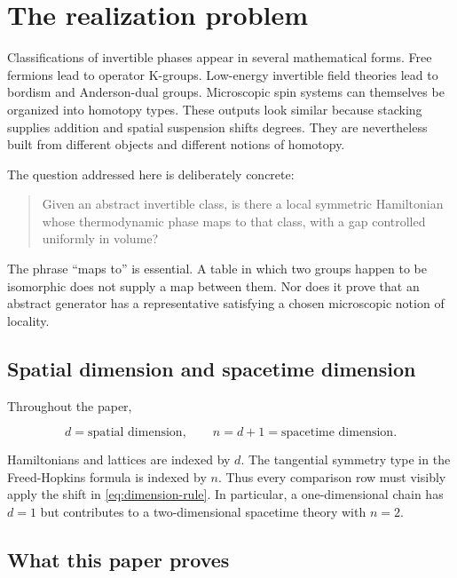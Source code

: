 \documentclass[12pt]{article}
\theoremstyle{definition}
\theoremstyle{remark}
\begin{document}
\section{The realization problem}

Classifications of invertible phases appear in several mathematical forms.
Free fermions lead to operator K-groups.  Low-energy invertible field
theories lead to bordism and Anderson-dual groups.  Microscopic spin systems
can themselves be organized into homotopy types.  These outputs look similar
because stacking supplies addition and spatial suspension shifts degrees.
They are nevertheless built from different objects and different notions of
homotopy.

The question addressed here is deliberately concrete:

\begin{quote}
Given an abstract invertible class, is there a local symmetric Hamiltonian
whose thermodynamic phase maps to that class, with a gap controlled uniformly
in volume?
\end{quote}

The phrase ``maps to'' is essential.  A table in which two groups happen to
be isomorphic does not supply a map between them.  Nor does it prove that an
abstract generator has a representative satisfying a chosen microscopic
notion of locality.

\subsection{Spatial dimension and spacetime dimension}

Throughout the paper,

\begin{equation}
  d=\text{spatial dimension},
  \qquad
  n=d+1=\text{spacetime dimension}.
  \label{eq:dimension-rule}
\end{equation}

Hamiltonians and lattices are indexed by $d$.  The tangential symmetry type
in the Freed-Hopkins formula is indexed by $n$.  Thus every comparison row
must visibly apply the shift in \cref{eq:dimension-rule}.  In particular, a
one-dimensional chain has $d=1$ but contributes to a two-dimensional
spacetime theory with $n=2$.

\subsection{What this paper proves}
\end{document}
